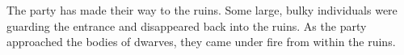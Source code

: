 The party has made their way to the ruins.
Some large, bulky individuals were guarding the entrance and disappeared back into the ruins.
As the party approached the bodies of dwarves, they came under fire from within the ruins.
